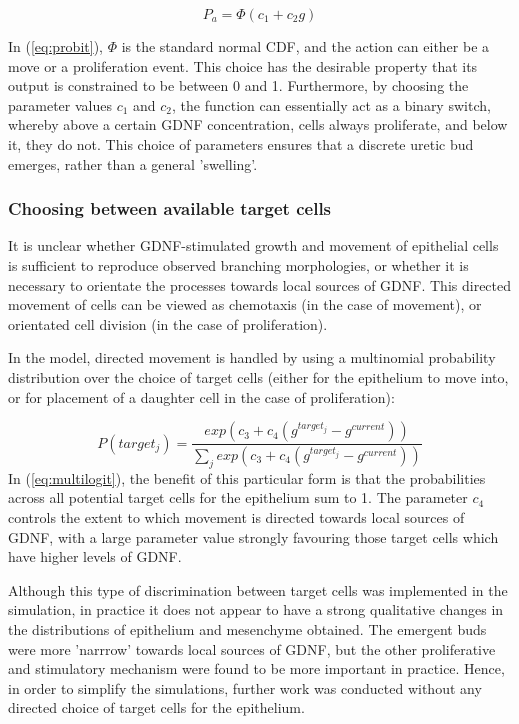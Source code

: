 \documentclass[pdftex,10pt,a4paper,twocolumn]{article}
\begin{document}
\begin{equation}\label{eq:probit}
P_a = \Phi(c_1 + c_2 g)
\end{equation}

In (\ref{eq:probit}), $\Phi$ is the standard normal CDF, and  the action can either be a move or a proliferation event. This choice has the desirable property that its output is constrained to be between 0 and 1. Furthermore, by choosing the parameter values $c_1$ and $c_2$, the function can essentially act as a binary switch, whereby above a certain GDNF concentration, cells always proliferate, and below it, they do not. This choice of parameters ensures that a discrete uretic bud emerges, rather than a general 'swelling'.

\subsubsection{Choosing between available target cells}\label{sec:target}
It is unclear whether GDNF-stimulated growth and movement of epithelial cells is sufficient to reproduce observed branching morphologies, or whether it is necessary to orientate the processes towards local sources of GDNF. This directed movement of cells can be viewed as chemotaxis (in the case of movement), or orientated cell division (in the case of proliferation).

In the model, directed movement is handled by using a multinomial probability distribution over the choice of target cells (either for the epithelium to move into, or for placement of a daughter cell in the case of proliferation):

\begin{equation} \label{eq:multilogit}
P(target_j) = \frac{exp(c_3 + c_4(g^{target_j} - g^{current}))}{\sum\limits_{j} exp(c_3 + c_4(g^{target_j} - g^{current}))}
\end{equation}
In (\ref{eq:multilogit}), the benefit of this particular form is that the probabilities across all potential target cells for the epithelium sum to 1. The parameter $c_4$ controls the extent to which movement is directed towards local sources of GDNF, with a large parameter value strongly favouring those target cells which have higher levels of GDNF.

Although this type of discrimination between target cells was implemented in the simulation, in practice it does not appear to have a strong qualitative changes in the distributions of epithelium and mesenchyme obtained. The emergent buds were more 'narrrow' towards local sources of GDNF, but the other proliferative and stimulatory mechanism were found to be more important in practice. Hence, in order to simplify the simulations, further work was conducted without any directed choice of target cells for the epithelium. 
\end{document}
